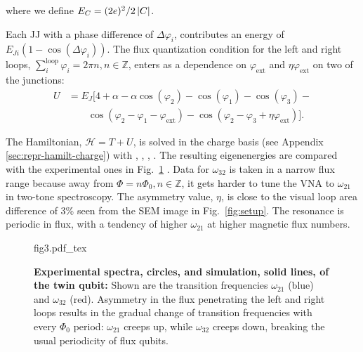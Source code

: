 \noindent where we define $ E_{C}={(2e)^{2}}/{2 \left|C\right| } $.

Each  JJ  with  a  phase  difference  of  $\Delta\varphi_{i}$,  contributes  an  energy  of
$ E_{Ji}\left(1 - \cos(\Delta\varphi_i)\right) $.   The flux quantization condition for the
left                     and                    right                     loops,
$ \sum_{i}^{\text{loop}}  \varphi_i = 2\pi  n, n \in \mathbb{Z}$,  enters as a  dependence on
$ \varphi_\text{ext} $ and $ \eta\varphi_\text{ext} $ on two of the junctions:
\begin{equation}\label{eq:potential}
  \begin{aligned}
    U & = E_J\big[4 + \alpha - \alpha\cos(\varphi_{2}) -\cos(\varphi_{1}) -\cos(\varphi_{3}) - \\
    &  \qquad  \cos(\varphi_{2}   -  \varphi_{1}  -  \varphi_{\text{ext}})  -  \cos(\varphi_{2}   -  \varphi_{3}  +
    \eta\varphi_{\text{ext}})\big].
  \end{aligned}
\end{equation}

The  Hamiltonian, $\mathcal{H}= T + U$, is  solved  in  the charge  basis (see  Appendix
\ref{sec:repr-hamilt-charge})  with
, , , . The resulting eigenenergies   are    compared    with    the    experimental    ones    in
Fig.~\ref{fig:experiment} .  Data for $ \omega_{32} $ is taken in a narrow flux range
because away from $ \Phi = n \Phi_0, n\in\mathbb{Z} $, it gets harder to tune the VNA to
$ \omega_{21} $  in two-tone spectroscopy.  The  asymmetry value, $ \eta $,  is close to
the  visual   loop  area  difference  of   3\%  seen  from  the   SEM  image  in
Fig.~\ref{fig:setup}.  The  resonance is  periodic in flux,  with a  tendency of
higher $\omega_{21}$ at higher magnetic flux numbers.

\begin{figure}[h]
  \centering\def\svgwidth{8cm}{fig3.pdf_tex}
  \caption{\small \textbf{Experimental spectra, circles, and  simulation, solid lines, of the
      twin  qubit:}   Shown  are   the  transition   frequencies  $   \omega_{21}  $   (blue)  and
    $ \omega_{32}$ (red).  Asymmetry  in the flux penetrating the left and  right loops results in
    the  gradual   change  of   transition  frequencies   with  every   $  \Phi_{0}   $  period:
    $\omega_{21}$ creeps  up, while $\omega_{32}$ creeps  down, breaking the usual  periodicity of flux
    qubits.  \label{fig:experiment}}
\end{figure}
 
